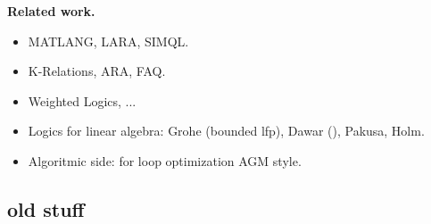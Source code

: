\medskip
\noindent
\textbf{Related work.} 

\begin{itemize}
\item MATLANG, LARA, SIMQL.

\item K-Relations, ARA, FAQ.

\item Weighted Logics, ...

\item Logics for linear algebra: Grohe (bounded lfp), Dawar (), Pakusa, Holm.

\item Algoritmic side: for loop optimization AGM style.
\end{itemize}


\subsection{old stuff}
%
%
